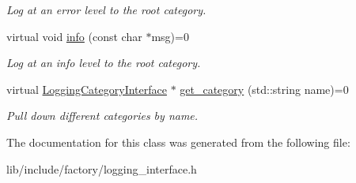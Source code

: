 \begin{DoxyCompactItemize}
\begin{DoxyCompactList}\small\item\em Log at an error level to the root category. \end{DoxyCompactList}\item 
\hypertarget{classLoggingInterface_a7aed25910dd1cdebe3906b4b33d75a80}{virtual void \hyperlink{classLoggingInterface_a7aed25910dd1cdebe3906b4b33d75a80}{info} (const char $\ast$msg)=0}\label{classLoggingInterface_a7aed25910dd1cdebe3906b4b33d75a80}

\begin{DoxyCompactList}\small\item\em Log at an info level to the root category. \end{DoxyCompactList}\item 
\hypertarget{classLoggingInterface_add380ece858220c46aeb38ce1531a6c7}{virtual \hyperlink{classLoggingCategoryInterface}{Logging\-Category\-Interface} $\ast$ \hyperlink{classLoggingInterface_add380ece858220c46aeb38ce1531a6c7}{get\-\_\-category} (std\-::string name)=0}\label{classLoggingInterface_add380ece858220c46aeb38ce1531a6c7}

\begin{DoxyCompactList}\small\item\em Pull down different categories by name. \end{DoxyCompactList}\end{DoxyCompactItemize}


The documentation for this class was generated from the following file\-:\begin{DoxyCompactItemize}
\item 
lib/include/factory/logging\-\_\-interface.\-h\end{DoxyCompactItemize}
